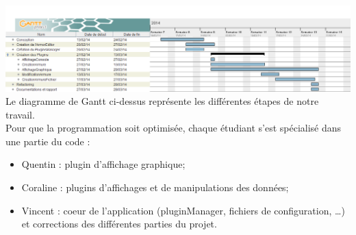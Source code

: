 \documentclass[a4paper]{article}
\begin{document}
\includegraphics[width=\textwidth]{../figures/gantt.png}\\

Le diagramme de Gantt ci-dessus représente les différentes étapes de notre travail.\\

Pour que la programmation soit optimisée, chaque étudiant s'est spécialisé dans une partie du code :
\begin{itemize}
	\item Quentin : plugin d'affichage graphique;
	\item Coraline : plugins d'affichages et de manipulations des données;  
	\item Vincent : coeur de l'application (pluginManager, fichiers de configuration, \dots) et corrections des différentes parties du projet.
\end{itemize}
\end{document}
